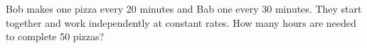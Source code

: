 Bob makes one pizza every 20 minutes and Bab one every 30 minutes. They start together and work independently at constant rates. How many hours are needed to complete 50 pizzas?
